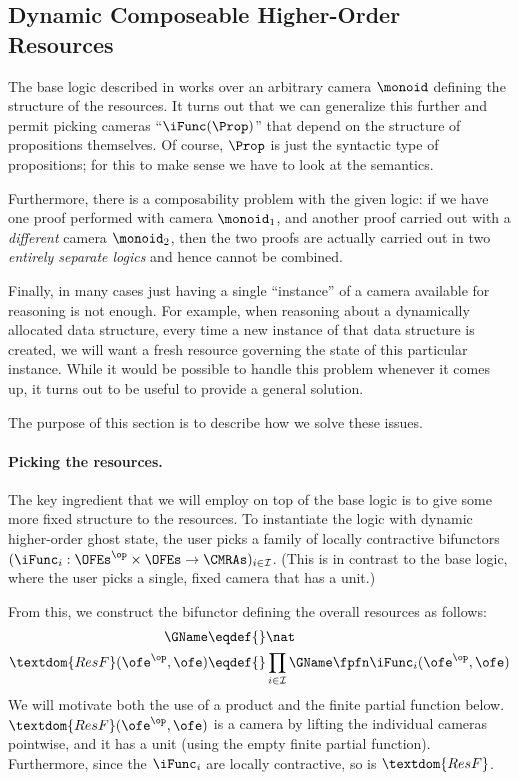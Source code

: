\subsection{Dynamic Composeable Higher-Order Resources}
\label{sec:composeable-resources}

The base logic described in  works over an arbitrary camera $\monoid$ defining the structure of the resources.
It turns out that we can generalize this further and permit picking cameras ``$\iFunc(\Prop)$'' that depend on the structure of propositions themselves.
Of course, $\Prop$ is just the syntactic type of propositions; for this to make sense we have to look at the semantics.

Furthermore, there is a composability problem with the given logic: if we have one proof performed with camera $\monoid_1$, and another proof carried out with a \emph{different} camera $\monoid_2$, then the two proofs are actually carried out in two \emph{entirely separate logics} and hence cannot be combined.

Finally, in many cases just having a single ``instance'' of a camera available for reasoning is not enough.
For example, when reasoning about a dynamically allocated data structure, every time a new instance of that data structure is created, we will want a fresh resource governing the state of this particular instance.
While it would be possible to handle this problem whenever it comes up, it turns out to be useful to provide a general solution.

The purpose of this section is to describe how we solve these issues.

\paragraph{Picking the resources.}
The key ingredient that we will employ on top of the base logic is to give some more fixed structure to the resources.
To instantiate the logic with dynamic higher-order ghost state, the user picks a family of locally contractive bifunctors $(\iFunc_i : \OFEs^\op \times \OFEs \to \CMRAs)_{i \in \mathcal{I}}$.
(This is in contrast to the base logic, where the user picks a single, fixed camera that has a unit.)

From this, we construct the bifunctor defining the overall resources as follows:
\begin{align*}
  \GName \eqdef{}& \nat \\
  \textdom{ResF}(\ofe^\op, \ofe) \eqdef{}& \prod_{i \in \mathcal I} \GName \fpfn \iFunc_i(\ofe^\op, \ofe)
\end{align*}
We will motivate both the use of a product and the finite partial function below.
$\textdom{ResF}(\ofe^\op, \ofe)$ is a camera by lifting the individual cameras pointwise, and it has a unit (using the empty finite partial function).
Furthermore, since the $\iFunc_i$ are locally contractive, so is $\textdom{ResF}$.

